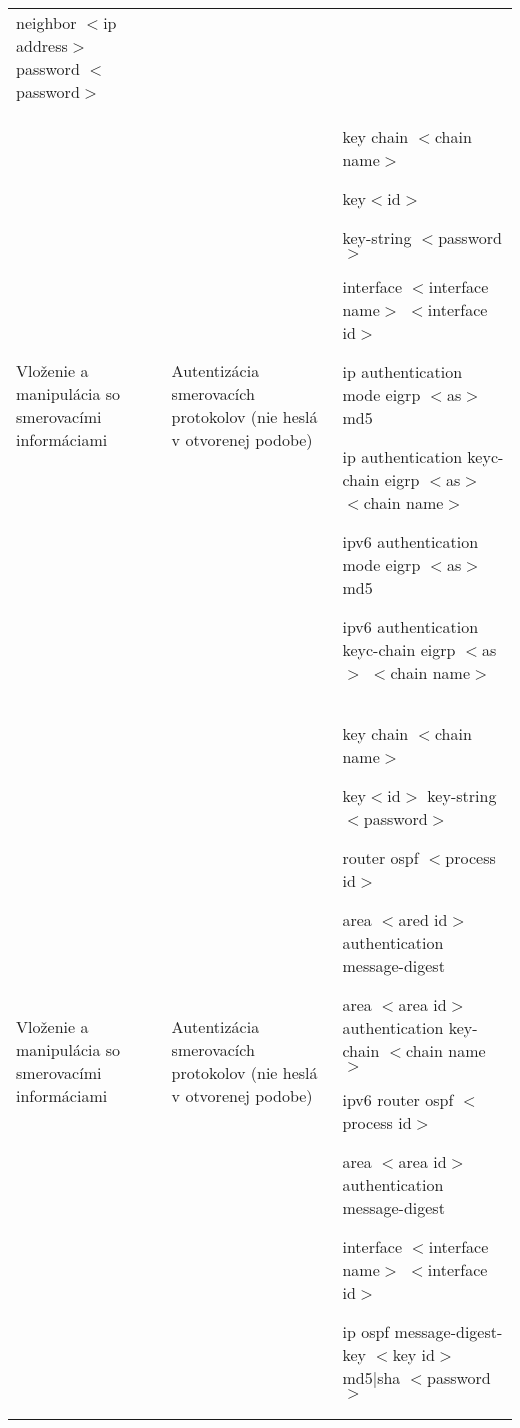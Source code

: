 \begin{longtable}[!htbp]{|L{10em}L{10em}>{\selectfont}L{34em}|}
	\hspace{0.5em}neighbor $<$ip address$>$ password $<$password$>$  \\
	
	
	
	
	 Vloženie a manipulácia so smerovacími informáciami	&Autentizácia smerovacích protokolov (nie heslá v otvorenej podobe)	&key chain $<$chain name$>$
	
	\hspace{0.5em}key$<$id$>$
	
	\hspace{1em}key-string $<$password$>$
	
	interface $<$interface name$>$ $<$interface id$>$
	
	\hspace{0.5em}ip authentication mode eigrp $<$as$>$ md5
	
	\hspace{0.5em}ip authentication keyc-chain eigrp $<$as$>$ $<$chain name$>$
	
	\hspace{0.5em}ipv6 authentication mode eigrp $<$as$>$ md5
	
	\hspace{0.5em}ipv6 authentication keyc-chain eigrp $<$as$>$ $<$chain name$>$\\
	
	
	
	
	Vloženie a manipulácia so smerovacími informáciami	&Autentizácia smerovacích protokolov (nie heslá v otvorenej podobe)	&key chain $<$chain name$>$
	
	\hspace{0.5em}key$<$id$>$
	\hspace{1em}key-string $<$password$>$
	
	router ospf $<$process id$>$
	
	\hspace{0.5em}area $<$ared id$>$ authentication message-digest
	
	\hspace{0.5em}area $<$area id$>$ authentication key-chain $<$chain name$>$
	
	ipv6 router ospf $<$process id$>$
	
	\hspace{0.5em}area $<$area id$>$ authentication message-digest
	
	interface $<$interface name$>$ $<$interface id$>$
	
	\hspace{0.5em}ip ospf message-digest-key $<$key id$>$ md5|sha $<$password$>$
	

\end{longtable}
